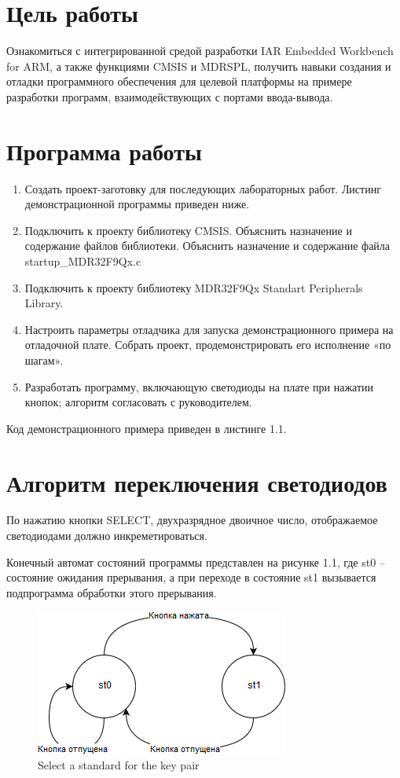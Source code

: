 \documentclass[14pt,a4paper,report]{report}
\begin{document}
\section {Цель работы}

Ознакомиться с интегрированной средой разработки IAR Embedded Workbench for ARM, а также функциями CMSIS и MDRSPL, получить навыки создания и отладки программного обеспечения для целевой платформы на примере разработки программ, взаимодействующих с портами ввода-вывода.

\section{Программа работы}

\begin{enumerate}
	\item Создать проект-заготовку для последующих лабораторных работ. Листинг демонстрационной программы приведен ниже.
	\item Подключить к проекту библиотеку CMSIS. Объяснить назначение и содержание файлов библиотеки. Объяснить назначение и содержание файла startup\_MDR32F9Qx.c
	\item Подключить к проекту библиотеку MDR32F9Qx Standart Peripherals Library.
	\item Настроить параметры отладчика для запуска демонстрационного примера на отладочной плате. Собрать проект, продемонстрировать его исполнение «по шагам».
	\item Разработать программу, включающую светодиоды на плате при нажатии кнопок; алгоритм согласовать с руководителем.
\end{enumerate}

Код демонстрационного примера приведен в листинге 1.1.



\section{Алгоритм переключения светодиодов}

По нажатию кнопки SELECT, двухразрядное двоичное число, отображаемое светодиодами должно инкреметироваться. 

Конечный автомат состояний программы представлен на рисунке 1.1, где st0 – состояние ожидания прерывания, а при переходе в состояние st1 вызывается подпрограмма обработки этого прерывания.

\begin{figure}[h!]
	\centering
	\includegraphics[scale = 1]{img/1_1.png}
	\caption{Select a standard for the key pair}
\end{figure}
\end{document}
